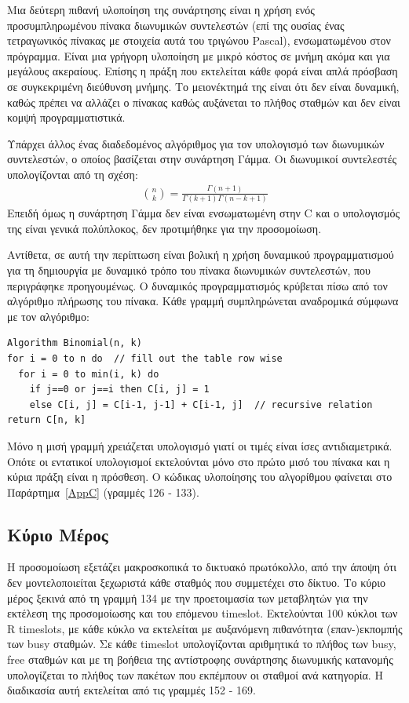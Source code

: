 \documentclass[12pt]{report}
\begin{document}
Μια δεύτερη πιθανή υλοποίηση της συνάρτησης είναι η χρήση ενός προσυμπληρωμένου πίνακα διωνυμικών συντελεστών (επί της ουσίας ένας τετραγωνικός πίνακας με στοιχεία αυτά του τριγώνου \textlatin{Pascal}), ενσωματωμένου στον πρόγραμμα. Είναι μια γρήγορη υλοποίηση με μικρό κόστος σε μνήμη ακόμα και για μεγάλους ακεραίους. Επίσης η πράξη που εκτελείται κάθε φορά είναι απλά πρόσβαση σε συγκεκριμένη διεύθυνση μνήμης. Το μειονέκτημά της είναι ότι δεν είναι δυναμική, καθώς πρέπει να αλλάζει ο πίνακας καθώς αυξάνεται το πλήθος σταθμών και δεν είναι κομψή προγραμματιστικά.

Υπάρχει άλλος ένας διαδεδομένος αλγόριθμος για τον υπολογισμό των διωνυμικών συντελεστών, ο οποίος βασίζεται στην συνάρτηση Γάμμα. Οι διωνυμικοί συντελεστές υπολογίζονται από τη σχέση:
\begin{align*}
  \binom{n}{k}={\frac {\Gamma (n+1)}{\Gamma (k+1)\Gamma (n-k+1)}}
\end{align*}
Επειδή όμως η συνάρτηση Γάμμα δεν είναι ενσωματωμένη στην \textlatin{C} και ο υπολογισμός της είναι γενικά πολύπλοκος, δεν προτιμήθηκε για την προσομοίωση.

Αντίθετα, σε αυτή την περίπτωση είναι βολική η χρήση δυναμικού προγραμματισμού για τη δημιουργία με δυναμικό τρόπο του πίνακα διωνυμικών συντελεστών, που περιγράφηκε προηγουμένως. Ο δυναμικός προγραμματισμός κρύβεται πίσω από τον αλγόριθμο πλήρωσης του πίνακα. Κάθε γραμμή συμπληρώνεται αναδρομικά σύμφωνα με τον αλγόριθμο:
\scriptsize
\begin{verbatim}
Algorithm Binomial(n, k)
for i = 0 to n do  // fill out the table row wise
  for i = 0 to min(i, k) do
    if j==0 or j==i then C[i, j] = 1
    else C[i, j] = C[i-1, j-1] + C[i-1, j]  // recursive relation
return C[n, k]
\end{verbatim}
\normalsize
{}
Μόνο η μισή γραμμή χρειάζεται υπολογισμό γιατί οι τιμές είναι ίσες αντιδιαμετρικά. Οπότε οι εντατικοί υπολογισμοί εκτελούνται μόνο στο πρώτο μισό του πίνακα και η κύρια πράξη είναι η πρόσθεση. Ο κώδικας υλοποίησης του αλγορίθμου φαίνεται στο Παράρτημα~\ref{AppC} (γραμμές 126 - 133).

\subsection{Κύριο Μέρος}
Η προσομοίωση εξετάζει μακροσκοπικά το δικτυακό πρωτόκολλο, από την άποψη ότι δεν μοντελοποιείται ξεχωριστά κάθε σταθμός που συμμετέχει στο δίκτυο. Το κύριο μέρος ξεκινά από τη γραμμή 134 με την προετοιμασία των μεταβλητών για την εκτέλεση της προσομοίωσης και του επόμενου \textlatin{timeslot}. Εκτελούνται 100 κύκλοι των \textlatin{R timeslots}, με κάθε κύκλο να εκτελείται με αυξανόμενη πιθανότητα (επαν-)εκπομπής των \textlatin{busy} σταθμών. Σε κάθε \textlatin{timeslot} υπολογίζονται αριθμητικά το πλήθος των \textlatin{busy, free} σταθμών και με τη βοήθεια της αντίστροφης συνάρτησης διωνυμικής κατανομής υπολογίζεται το πλήθος των πακέτων που εκπέμπουν οι σταθμοί ανά κατηγορία. Η διαδικασία αυτή εκτελείται από τις γραμμές 152 - 169.
\end{document}

